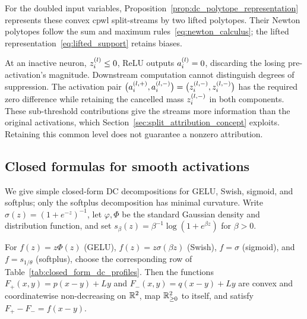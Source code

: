 For the doubled input variables, Proposition~\ref{prop:dc_polytope_representation} represents these convex \ac{cpwl} split-streams by two lifted polytopes. Their Newton polytopes follow the sum and maximum rules~\eqref{eq:newton_calculus}; the lifted representation~\eqref{eq:lifted_support} retains biases.

\begin{remark}\label{rem:subthreshold}
At an inactive neuron, $z^{(l)}_i\le0$, ReLU outputs $a^{(l)}_i=0$, discarding the losing pre-activation's magnitude. Downstream computation cannot distinguish degrees of suppression. The activation pair $\bigl(a^{(l,+)}_i,a^{(l,-)}_i\bigr)=\bigl(z^{(l,-)}_i,z^{(l,-)}_i\bigr)$ has the required zero difference while retaining the cancelled mass $z^{(l,-)}_i$ in both components. These sub-threshold contributions give the streams more information than the original activations, which Section~\ref{sec:split_attribution_concept} exploits. Retaining this common level does not guarantee a nonzero attribution.
\end{remark}

\subsection{Closed formulas for smooth activations}\label{sec:closed_form_dc_activations}

We give simple closed-form DC decompositions for GELU, Swish, sigmoid, and softplus; only the softplus decomposition has minimal curvature. Write $\sigma(z)=(1+e^{-z})^{-1}$, let $\varphi,\Phi$ be the standard Gaussian density and distribution function, and set $s_\beta(z)=\beta^{-1}\log(1+e^{\beta z})$ for $\beta>0$.

\begin{corollary}\label{cor:closed_form_dc_activations}
For $f(z)=z\Phi(z)$ (GELU), $f(z)=z\sigma(\beta z)$ (Swish), $f=\sigma$ (sigmoid), and $f=s_{1/\theta}$ (softplus), choose the corresponding row of Table~\ref{tab:closed_form_dc_profiles}. Then the functions $F_+(x,y)=p(x-y)+Ly$ and $F_-(x,y)=q(x-y)+Ly$ are convex and coordinatewise non-decreasing on $\mathbb{R}^2$, map $\mathbb{R}^2_{\ge0}$ to itself, and satisfy $F_+-F_-=f(x-y)$.
\end{corollary}

